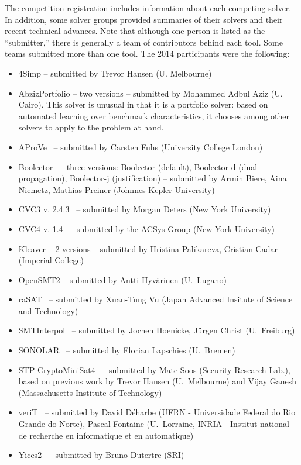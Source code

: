 \documentclass[twoside,11pt]{article}
\begin{document}
The competition registration includes information about each competing solver. In addition, some solver groups provided summaries of their solvers and their recent technical advances.
 Note that although one person is listed as the ``submitter,'' there is generally a team of contributors behind each tool. Some teams submitted more than one tool. The 2014 participants were the following:
\begin{itemize}
\item 4Simp -- submitted by Trevor Hansen (U. Melbourne)
\item AbzizPortfolio -- two versions -- submitted by Mohammed Adbul Aziz (U. Cairo). This solver is unusual in that it is a portfolio solver: based on automated learning over benchmark characteristics, it chooses among other solvers to apply to the problem at hand.
\item AProVe~\cite{AProVE2014} -- submitted by Carsten Fuhs (University College London)
\item Boolector~\cite{Boolector2015} -- three versions: Boolector (default),  Boolector-d (dual propagation), Boolector-j (justification) -- submitted by Armin Biere, Aina Niemetz, Mathias Preiner (Johnnes Kepler University)
\item CVC3 v. 2.4.3~\cite{BT07} -- submitted by Morgan Deters (New York University)
\item CVC4 v. 1.4~\cite{BCD+11} -- submitted by the ACSys Group (New York University)
\item Kleaver -- 2 versions -- submitted by Hristina Palikareva, Cristian Cadar (Imperial College)
\item OpenSMT2 -- submitted by Antti Hyv\"arinen (U.~Lugano)
\item raSAT~\cite{DBLP:conf/smt/KhanhVO14} -- submitted by Xuan-Tung Vu (Japan Advanced Insitute of Science and Technology)
\item SMTInterpol~\cite{DBLP:conf/spin/ChristHN12,DBLP:conf/spin/2012} -- submitted by Jochen Hoenicke, J\"urgen Christ (U.~Freiburg)
\item SONOLAR~\cite{Peleska:2011:ATC:1986308.1986333} -- submitted by Florian Lapschies (U.~Bremen)
\item STP-CryptoMiniSat4~\cite{DBLP:conf/cav/GaneshD07,DBLP:conf/cav/2007} -- submitted by Mate Soos (Security Research Lab.), based on previous work by Trevor Hansen (U.~Melbourne) and Vijay Ganesh (Massachusetts Institute of Technology)
\item veriT~\cite{veriT} -- submitted by David D\'{e}harbe (UFRN - Universidade Federal do Rio Grande do Norte), Pascal Fontaine (U.~Lorraine, INRIA - Institut national de recherche en informatique et en automatique)
\item Yices2~\cite{Dutertre:cav2014} -- submitted by Bruno Dutertre (SRI)
\end{itemize}
\end{document}
